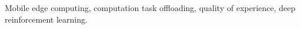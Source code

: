 \documentclass[10pt, journal,letterpaper]{IEEEtran}
\begin{document}
\begin{IEEEkeywords}
Mobile edge computing, computation task offloading, quality of experience, deep reinforcement learning.
\end{IEEEkeywords}

%
\IEEEpeerreviewmaketitle




\end{document}
